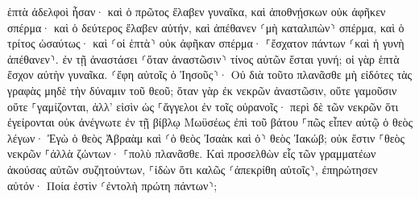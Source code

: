 \documentclass{openreader}
\begin{document}
ἑπτὰ ἀδελφοὶ ἦσαν· καὶ ὁ πρῶτος ἔλαβεν γυναῖκα, καὶ ἀποθνῄσκων οὐκ ἀφῆκεν σπέρμα· 
καὶ ὁ δεύτερος ἔλαβεν αὐτήν, καὶ ἀπέθανεν ⸂μὴ καταλιπὼν⸃ σπέρμα, καὶ ὁ τρίτος ὡσαύτως· 
καὶ ⸂οἱ ἑπτὰ⸃ οὐκ ἀφῆκαν σπέρμα· ⸀ἔσχατον πάντων ⸂καὶ ἡ γυνὴ ἀπέθανεν⸃. 
ἐν τῇ ἀναστάσει ⸂ὅταν ἀναστῶσιν⸃ τίνος αὐτῶν ἔσται γυνή; οἱ γὰρ ἑπτὰ ἔσχον αὐτὴν γυναῖκα. 
⸂ἔφη αὐτοῖς ὁ Ἰησοῦς⸃· Οὐ διὰ τοῦτο πλανᾶσθε μὴ εἰδότες τὰς γραφὰς μηδὲ τὴν δύναμιν τοῦ θεοῦ; 
ὅταν γὰρ ἐκ νεκρῶν ἀναστῶσιν, οὔτε γαμοῦσιν οὔτε ⸀γαμίζονται, ἀλλ’ εἰσὶν ὡς ⸀ἄγγελοι ἐν τοῖς οὐρανοῖς· 
περὶ δὲ τῶν νεκρῶν ὅτι ἐγείρονται οὐκ ἀνέγνωτε ἐν τῇ βίβλῳ Μωϋσέως ἐπὶ τοῦ βάτου ⸀πῶς εἶπεν αὐτῷ ὁ θεὸς λέγων· Ἐγὼ ὁ θεὸς Ἀβραὰμ καὶ ⸂ὁ θεὸς Ἰσαὰκ καὶ ὁ⸃ θεὸς Ἰακώβ; 
οὐκ ἔστιν ⸀θεὸς νεκρῶν ⸀ἀλλὰ ζώντων· ⸀πολὺ πλανᾶσθε. 
Καὶ προσελθὼν εἷς τῶν γραμματέων ἀκούσας αὐτῶν συζητούντων, ⸀ἰδὼν ὅτι καλῶς ⸂ἀπεκρίθη αὐτοῖς⸃, ἐπηρώτησεν αὐτόν· Ποία ἐστὶν ⸂ἐντολὴ πρώτη πάντων⸃; 
\end{document}
